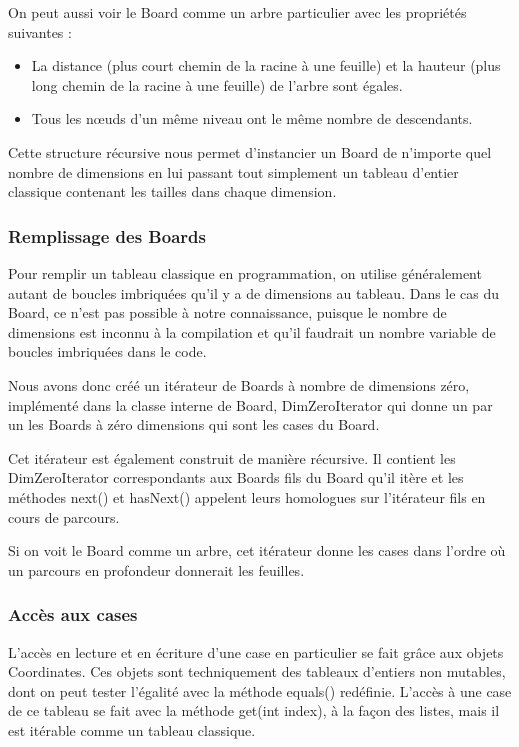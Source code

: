 	On peut aussi voir le Board comme un arbre particulier avec les propriétés suivantes : \newline
		\begin{itemize}
			\item La distance (plus court chemin de la racine à une feuille) et la hauteur (plus long chemin de la racine à une feuille) de l'arbre sont égales.\newline
			\item Tous les nœuds d'un même niveau ont le même nombre de descendants.
		\end{itemize}

	Cette structure récursive nous permet d'instancier un Board de n'importe quel nombre de dimensions en lui passant tout simplement un tableau d'entier classique contenant les tailles dans chaque dimension.


	\subsubsection{Remplissage des Boards}

	Pour remplir un tableau classique en programmation, on utilise généralement autant de boucles imbriquées qu'il y a de dimensions au tableau. Dans le cas du Board, ce n'est pas possible à notre connaissance, puisque le nombre de dimensions est inconnu à la compilation et qu'il faudrait un nombre variable de boucles imbriquées dans le code.\newline
	
	Nous avons donc créé un itérateur de Boards à nombre de dimensions zéro, implémenté dans la classe interne de Board, DimZeroIterator qui donne un par un les Boards à zéro dimensions qui sont les cases du Board. \newline

	Cet itérateur est également construit de manière récursive. Il contient les DimZeroIterator correspondants aux Boards fils du Board qu'il itère et les méthodes next() et hasNext() appelent leurs homologues sur l'itérateur fils en cours de parcours.

	Si on voit le Board comme un arbre, cet itérateur donne les cases dans l'ordre où un parcours en profondeur donnerait les feuilles.

	\subsubsection{Accès aux cases}

	L'accès en lecture et en écriture d'une case en particulier se fait grâce aux objets Coordinates.
Ces objets sont techniquement des tableaux d'entiers non mutables, dont on peut tester l'égalité avec la méthode equals() redéfinie. L'accès à une case de ce tableau se fait avec la méthode get(int index), à la façon des listes, mais il est itérable comme un tableau classique.\newline

